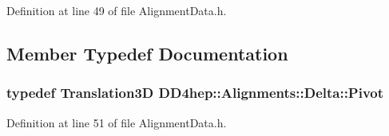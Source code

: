 Definition at line 49 of file AlignmentData.h.

\subsection{Member Typedef Documentation}
\hypertarget{class_d_d4hep_1_1_alignments_1_1_delta_a9ff8cc825f916a4ae84f1780c11f2519}{
\subsubsection[{Pivot}]{\setlength{\rightskip}{0pt plus 5cm}typedef Translation3D {\bf DD4hep::Alignments::Delta::Pivot}}}
\label{class_d_d4hep_1_1_alignments_1_1_delta_a9ff8cc825f916a4ae84f1780c11f2519}


Definition at line 51 of file AlignmentData.h.

